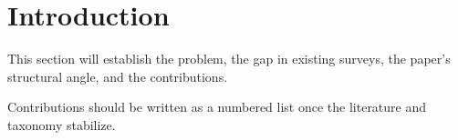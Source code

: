 \section{Introduction}

This section will establish the problem, the gap in existing surveys, the paper's structural angle, and the contributions.

Contributions should be written as a numbered list once the literature and taxonomy stabilize.

